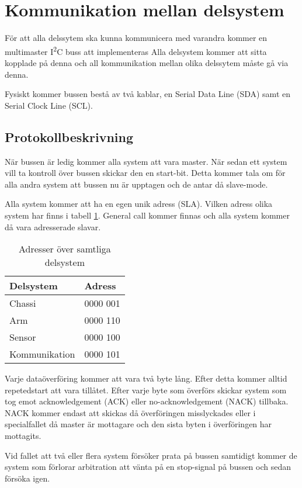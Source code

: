 \section{Kommunikation mellan delsystem}

För att alla delssytem ska kunna kommunicera med varandra kommer en multimaster I\textsuperscript{2}C buss att implementeras Alla delsystem kommer att sitta kopplade på denna och all kommunikation mellan olika delssytem måste gå via denna.

Fysiskt kommer bussen bestå av två kablar, en Serial Data Line (SDA) samt en Serial Clock Line (SCL).

\subsection{Protokollbeskrivning}
När bussen är ledig kommer alla system att vara master. När sedan ett system vill ta kontroll över bussen skickar den en start-bit. Detta kommer tala om för alla andra system att bussen nu är upptagen och de antar då slave-mode.

Alla system kommer att ha en egen unik adress (SLA). Vilken adress olika system har finns i tabell \ref{tab:adresstab}. General call kommer finnas och alla system kommer då vara adresserade slavar.

\begin{table}[h]
\centering
\begin{tabular}{|l|l|}
\hline
\textbf{Delsystem} & \textbf{Adress} \\
\hline
Chassi & 0000 001\\
\hline
Arm & 0000 110\\
\hline
Sensor & 0000 100\\
\hline
Kommunikation & 0000 101\\
\hline
\end{tabular}
\caption{Adresser över samtliga delsystem}
\label{tab:adresstab}
\end{table}

Varje dataöverföring kommer att vara två byte lång. Efter detta kommer alltid repetedstart att vara tillåtet. Efter varje byte som överförs skickar system som tog emot acknowledgement (ACK) eller no-acknowledgement (NACK) tillbaka. NACK kommer endast att skickas då överföringen misslyckades eller i specialfallet då master är mottagare och den sista byten i överföringen har mottagits.

Vid fallet att två eller flera system försöker prata på bussen samtidigt kommer de system som förlorar arbitration att vänta på en stop-signal på bussen och sedan försöka igen.

